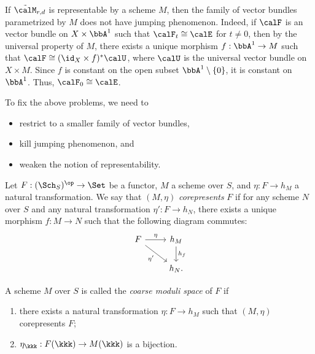     If \(\tilde{\calM}_{r,d}\) is representable by a scheme \(M\), then the family of vector bundles parametrized by \(M\) does not have jumping phenomenon.
    Indeed, if \(\calF\) is an vector bundle on \(X \times \bbA^1\) such that \(\calF_t \cong \calE\) for \(t \neq 0\), 
    then by the universal property of \(M\), there exists a unique morphism \(f : \bbA^1 \to M\) such that \(\calF \cong (\id_X \times f)^* \calU\), 
    where \(\calU\) is the universal vector bundle on \(X \times M\).
    Since \(f\) is constant on the open subset \(\bbA^1 \setminus \{0\}\), it is constant on \(\bbA^1\).
    Thus, \(\calF_0 \cong \calE\).

    To fix the above problems, we need to 
    \begin{itemize}
        \item restrict to a smaller family of vector bundles,
        \item kill jumping phenomenon, and
        \item weaken the notion of representability.
    \end{itemize}



    \begin{definition}\label{def:corepresents_functor}
        Let \(F: (\Sch_S)^{\op} \to \Set\) be a functor, \(M\) a scheme over \(S\), and \(\eta : F \to h_M\) a natural transformation.
        We say that \((M, \eta)\) \emph{corepresents} \(F\) 
        if for any scheme \(N\) over \(S\) and any natural transformation \(\eta' : F \to h_N\), 
        there exists a unique morphism \(f : M \to N\) such that the following diagram commutes:
        \[ \begin{tikzcd}
            F \arrow[r, "\eta"] \arrow[dr, "\eta'"'] & h_M \arrow[d, "h_f"] \\
             & h_N.
        \end{tikzcd} \]
    \end{definition}

    \begin{definition}\label{def:coarse_moduli_space}
        A scheme \(M\) over \(S\) is called the \emph{coarse moduli space} of \(F\) if 
        \begin{enumerate}
            \item there exists a natural transformation \(\eta : F \to h_M\) such that \((M, \eta)\) corepresents \(F\);
            \item \(\eta_\kkk : F(\kkk) \to M(\kkk)\) is a bijection.
        \end{enumerate}
    \end{definition}

